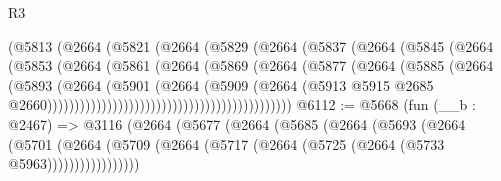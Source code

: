 \begin{lexlean}{R3}
\begin{coremodule}
                                        (@5813
                                          (@2664
                                            (@5821
                                              (@2664
                                                (@5829
                                                  (@2664
                                                    (@5837
                                                      (@2664
                                                        (@5845
                                                          (@2664
                                                            (@5853
                                                              (@2664
                                                                (@5861
                                                                  (@2664
                                                                    (@5869
                                                                      (@2664
                                                                        (@5877
                                                                          (@2664
                                                                            (@5885
                                                                              (@2664
                                                                                (@5893
                                                                                  (@2664
                                                                                    (@5901
                                                                                      (@2664
                                                                                        (@5909
                                                                                          (@2664
                                                                                            (@5913
                                                                                              @5915
                                                                                              @2685
                                                                                              @2660)))))))))))))))))))))))))))))))))))))))))))))
@6112 := @5668
    (fun (__b : @2467) =>
    @3116
      (@2664
        (@5677
          (@2664
            (@5685
              (@2664
                (@5693
                  (@2664
                    (@5701
                      (@2664 (@5709 (@2664 (@5717 (@2664 (@5725 (@2664 (@5733 @5963)))))))))))))))))

\end{coremodule}
\end{lexlean}
